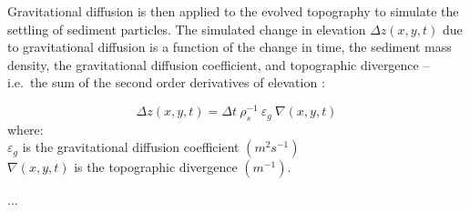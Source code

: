 \documentclass[esurf, manuscript]{copernicus}
\begin{document}
\noindent
Gravitational diffusion is then applied to the evolved topography
to simulate the settling of sediment particles. 
The simulated change in elevation $\Delta z(x,y,t) $ due to gravitational diffusion 
is a function of the change in time, the sediment mass density, 
the gravitational diffusion coefficient, and topographic divergence 
-- i.e.~the sum of the second order derivatives of elevation
\cite{thaxton2004}:

\begin{equation}
\label{eq:grav_diffusion} 
{\Delta z(x,y,t) = \Delta t ~ \rho_s^{-1} ~ \varepsilon_g ~ \nabla(x,y,t)}
\end{equation}
%
{\small
\noindent
where: \\
\noindent
\hspace*{0.5em} $\varepsilon_g$ is the gravitational diffusion coefficient $(m^{2} s^{-1})$\\ %
\hspace*{0.5em} $\nabla(x,y,t)$ is the topographic divergence $(m^{-1})$.\\
}


\conclusions  %
...






\end{document}
